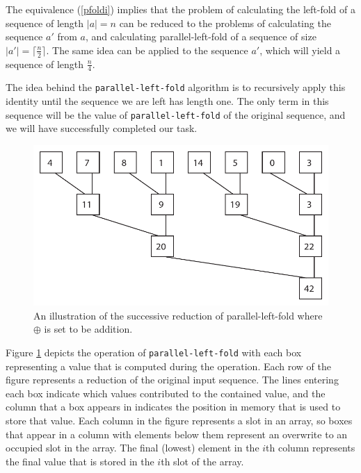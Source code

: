\documentclass[12pt,twoside]{reedthesis}
\newcommand{\procedure}[1]{{\tt#1}}
\begin{document}
The equivalence (\ref{pfoldi}) implies that the problem of calculating the left-fold of a sequence of length $|a| = n$ can be reduced to the problems of calculating the sequence $a'$ from $a$, and calculating parallel-left-fold of a sequence of size $|a'| = \lceil \frac{n}{2} \rceil$. The same idea can be applied to the sequence $a'$, which will yield a sequence of length $\frac{n}{4}$.

The idea behind the \procedure{parallel-left-fold} algorithm is to recursively apply this identity until the sequence we are left has length one. The only term in this sequence will be the value of \procedure{parallel-left-fold} of the original sequence, and we will have successfully completed our task.

\begin{figure}[h!]
\includegraphics{parallel-left-fold-tree.pdf}
\caption{An illustration of the successive reduction of
  parallel-left-fold where $\oplus$ is set to be addition.}
\label{plfd}
\end{figure}
\vspace{1pc}

Figure \ref{plfd} depicts the operation of \procedure{parallel-left-fold} with each box representing a value that is computed during the operation. Each row of the figure represents a reduction of the original input sequence. The lines entering each box indicate which values contributed to the contained value, and the column that a box appears in indicates the position in memory that is used to store that value. Each column in the figure represents a slot in an array, so boxes that appear in a column with elements below them represent an overwrite to an occupied slot in the array. The final (lowest) element in the $i$th column represents the final value that is stored in the $i$th slot of the array.
\end{document}
